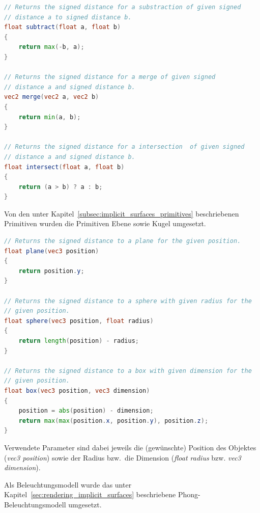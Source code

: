\begin{lstlisting}[language=GLSL,caption={Umsetzung von Operationen für
        implizite Oberflächen in
        GLSL.},label={alg:glsl_ops},captionpos=b,emph={subtract,merge,intersect}]
// Returns the signed distance for a substraction of given signed
// distance a to signed distance b.
float subtract(float a, float b)
{
    return max(-b, a);
}

// Returns the signed distance for a merge of given signed
// distance a and signed distance b.
vec2 merge(vec2 a, vec2 b)
{
    return min(a, b);
}

// Returns the signed distance for a intersection  of given signed
// distance a and signed distance b.
float intersect(float a, float b)
{
    return (a > b) ? a : b;
}
\end{lstlisting}

Von den unter Kapitel~\ref{subsec:implicit_surfaces_primitives} beschriebenen
Primitiven wurden die Primitiven Ebene sowie Kugel umgesetzt.

\begin{lstlisting}[language=GLSL,caption={Umsetzung von Primitiven in Form von impliziten Oberflächen in GLSL.},label={alg:glsl_primitives},captionpos=b,emph={plane,sphere,box}]
// Returns the signed distance to a plane for the given position.
float plane(vec3 position)
{
    return position.y;
}

// Returns the signed distance to a sphere with given radius for the
// given position.
float sphere(vec3 position, float radius)
{
    return length(position) - radius;
}

// Returns the signed distance to a box with given dimension for the
// given position.
float box(vec3 position, vec3 dimension)
{
    position = abs(position) - dimension;
    return max(max(position.x, position.y), position.z);
}
\end{lstlisting}

Verwendete Parameter sind dabei jeweils die (gewünschte) Position des Objektes
(\textit{vec3 position}) sowie der Radius bzw.\ die Dimension
(\textit{float radius} bzw. \textit{vec3 dimension}).

Als Beleuchtungsmodell wurde das unter
Kapitel~\ref{sec:rendering_implicit_surfaces} beschriebene
Phong-Beleuchtungsmodell umgesetzt.


